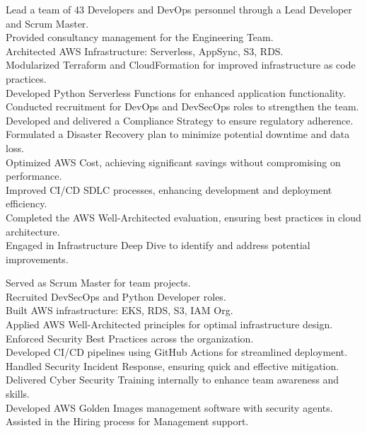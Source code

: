 \documentclass[10pt,a4paper,sans]{moderncv} %
\begin{document}
{
	Lead a team of 43 Developers and DevOps personnel through a Lead Developer and Scrum Master.\\
	Provided consultancy management for the Engineering Team.\\
	Architected AWS Infrastructure: Serverless, AppSync, S3, RDS.\\
	Modularized Terraform and CloudFormation for improved infrastructure as code practices.\\
	Developed Python Serverless Functions for enhanced application functionality.\\
	Conducted recruitment for DevOps and DevSecOps roles to strengthen the team.\\
	Developed and delivered a Compliance Strategy to ensure regulatory adherence.\\
	Formulated a Disaster Recovery plan to minimize potential downtime and data loss.\\
	Optimized AWS Cost, achieving significant savings without compromising on performance.\\
	Improved CI/CD SDLC processes, enhancing development and deployment efficiency.\\
	Completed the AWS Well-Architected evaluation, ensuring best practices in cloud architecture.\\
	Engaged in Infrastructure Deep Dive to identify and address potential improvements.\\
}

{
	Served as Scrum Master for team projects.\\
	Recruited DevSecOps and Python Developer roles.\\
	Built AWS infrastructure: EKS, RDS, S3, IAM Org.\\
	Applied AWS Well-Architected principles for optimal infrastructure design.\\
	Enforced Security Best Practices across the organization.\\
	Developed CI/CD pipelines using GitHub Actions for streamlined deployment.\\
	Handled Security Incident Response, ensuring quick and effective mitigation.\\
	Delivered Cyber Security Training internally to enhance team awareness and skills.\\
	Developed AWS Golden Images management software with security agents.\\
	Assisted in the Hiring process for Management support.\\
}
\end{document}
